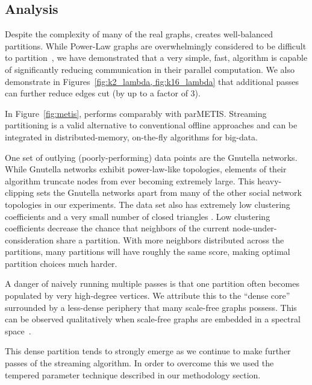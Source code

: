 \subsection{Analysis}
Despite the complexity of many of the real graphs, \ourmethod creates well-balanced partitions.
While Power-Law graphs are overwhelmingly considered to be difficult to partition~\cite{Abou-Rjeili:2006:MAP:1898953.1899055}, we have demonstrated that a very simple, fast, algorithm is capable of significantly reducing communication in their parallel computation. 
We also demonstrate in Figures~\ref{fig:k2_lambda, fig:k16_lambda} that additional passes can further reduce edges cut (by up to a factor of 3). 

In Figure~\ref{fig:metis}, \ourmethod performs comparably with parMETIS.  
Streaming partitioning is a valid alternative to conventional offline approaches and can be integrated in distributed-memory, on-the-fly algorithms for big-data.

One set of outlying (poorly-performing) data points are the Gnutella networks.
While Gnutella networks exhibit power-law-like topologies, elements of their algorithm truncate nodes from ever becoming extremely large. 
This heavy-clipping sets the Gnutella networks apart from many of the other social network topologies in our experiments.
The data set also has extremely low clustering coefficients and a very small number of closed triangles \cite{Ripeanu:2002:MGN:613352.613670}. 
Low clustering coefficients decrease the chance that neighbors of the current node-under-consideration share a partition. 
With more neighbors distributed across the partitions, many partitions will have roughly the same score, making optimal partition choices much harder.

A danger of naively running multiple passes is that one partition often becomes populated by very high-degree vertices. 
We attribute this to the ``dense core'' surrounded by a less-dense periphery that many scale-free graphs possess.
This can be observed qualitatively when scale-free graphs are embedded in a spectral space~\cite{Lang04findinggood}.

This dense partition tends to strongly emerge as we continue to make further passes of the streaming algorithm.
In order to overcome this we used the tempered parameter technique described in our methodology section. 

